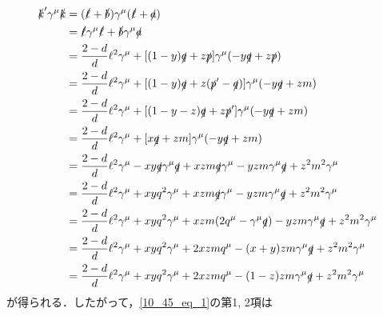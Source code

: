 \begin{align*}
  \slashed{k}' \gamma^\mu \slashed{k} &= (\slashed\ell + \slashed{b}) \gamma^\mu (\slashed\ell + \slashed{a}) \\
  &= \slashed\ell \gamma^\mu \slashed\ell + \slashed{b} \gamma^\mu \slashed{a} \\
  &= \frac{2-d}{d} \ell^2 \gamma^\mu + [(1-y)\slashed{q} + z\slashed{p}] \gamma^\mu (-y\slashed{q} + z\slashed{p}) \\
  &= \frac{2-d}{d} \ell^2 \gamma^\mu + [(1-y)\slashed{q} + z(\slashed{p}' - \slashed{q})] \gamma^\mu (-y\slashed{q} + zm) \\
  &= \frac{2-d}{d} \ell^2 \gamma^\mu + [(1-y-z)\slashed{q} + z\slashed{p}'] \gamma^\mu (-y\slashed{q} + zm) \\
  &= \frac{2-d}{d} \ell^2 \gamma^\mu + [x\slashed{q} + zm] \gamma^\mu (-y\slashed{q} + zm) \\
  &= \frac{2-d}{d} \ell^2 \gamma^\mu - xy \slashed{q} \gamma^\mu \slashed{q}
  + xzm \slashed{q} \gamma^\mu - yzm \gamma^\mu \slashed{q} + z^2m^2 \gamma^\mu \\
  &= \frac{2-d}{d} \ell^2 \gamma^\mu + xy q^2 \gamma^\mu
  + xzm \slashed{q} \gamma^\mu - yzm \gamma^\mu \slashed{q} + z^2m^2 \gamma^\mu \\
  &= \frac{2-d}{d} \ell^2 \gamma^\mu + xy q^2 \gamma^\mu
  + xzm (2q^\mu - \gamma^\mu \slashed{q}) - yzm \gamma^\mu \slashed{q} + z^2m^2 \gamma^\mu \\
  &= \frac{2-d}{d} \ell^2 \gamma^\mu + xy q^2 \gamma^\mu
  + 2xzm q^\mu - (x+y)zm \gamma^\mu \slashed{q} + z^2m^2 \gamma^\mu \\
  &= \frac{2-d}{d} \ell^2 \gamma^\mu + xy q^2 \gamma^\mu
  + 2xzm q^\mu - (1-z)zm \gamma^\mu \slashed{q} + z^2m^2 \gamma^\mu
\end{align*}
が得られる．したがって，\eqref{10_45_eq_1}の第1, 2項は

